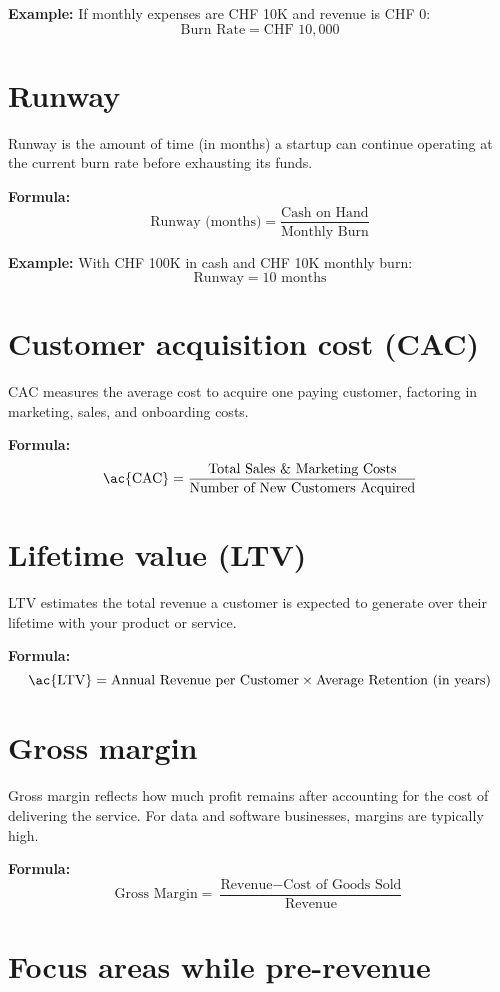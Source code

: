 \textbf{Example:}  
If monthly expenses are CHF 10K and revenue is CHF 0:
\[
\text{Burn Rate} = \text{CHF }10{,}000
\]

\section*{Runway}

Runway is the amount of time (in months) a startup can continue operating at the current burn rate before exhausting its funds.

\textbf{Formula:}
\[
\text{Runway (months)} = \frac{\text{Cash on Hand}}{\text{Monthly Burn}}
\]

\textbf{Example:}  
With CHF 100K in cash and CHF 10K monthly burn:
\[
\text{Runway} = 10 \text{ months}
\]

\section*{Customer acquisition cost (\ac{CAC})}

\ac{CAC} measures the average cost to acquire one paying customer, factoring in marketing, sales, and onboarding costs.

\textbf{Formula:}
\[
\text{\ac{CAC}} = \frac{\text{Total Sales \& Marketing Costs}}{\text{Number of New Customers Acquired}}
\]

\section*{Lifetime value (\ac{LTV})}

\ac{LTV} estimates the total revenue a customer is expected to generate over their lifetime with your product or service.

\textbf{Formula:}
\[
\text{\ac{LTV}} = \text{Annual Revenue per Customer} \times \text{Average Retention (in years)}
\]

\section*{Gross margin}

Gross margin reflects how much profit remains after accounting for the cost of delivering the service. For data and software businesses, margins are typically high.

\textbf{Formula:}
\[
\text{Gross Margin} = \frac{\text{Revenue} - \text{Cost of Goods Sold}}{\text{Revenue}}
\]

\section*{Focus areas while pre-revenue}


